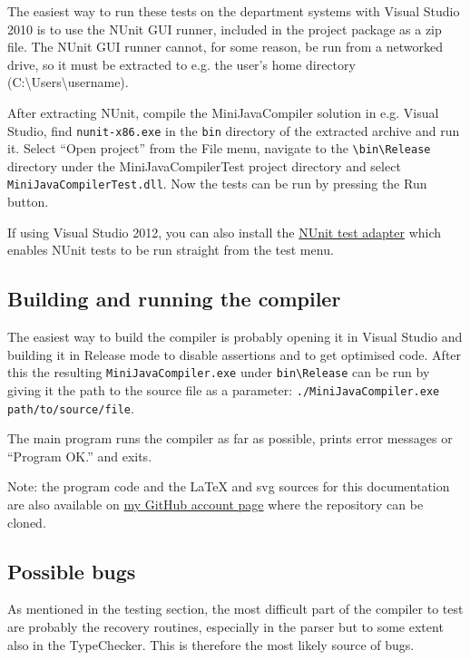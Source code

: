 \documentclass[a4paper,11pt]{article}
\begin{document}
The easiest way to run these tests on the department systems with Visual Studio 2010 is to use the NUnit GUI runner, included in the project package as a zip file. The NUnit GUI runner cannot, for some reason, be run from a networked drive, so it must be extracted to e.g. the user's home directory (C:\textbackslash Users\textbackslash username).

After extracting NUnit, compile the MiniJavaCompiler solution in e.g. Visual Studio, find \verb,nunit-x86.exe, in the \verb,bin, directory of the extracted archive and run it. Select ``Open project'' from the File menu, navigate to the \verb,\bin\Release, directory under the MiniJavaCompilerTest project directory and select \verb,MiniJavaCompilerTest.dll,. Now the tests can be run by pressing the Run button.

If using Visual Studio 2012, you can also install the \href{http://nunit.org/index.php?p=vsTestAdapter&r=2.6.1}{NUnit test adapter} which enables NUnit tests to be run straight from the test menu.

\subsection{Building and running the compiler}

The easiest way to build the compiler is probably opening it in Visual Studio and building it in Release mode to disable assertions and to get optimised code. After this the resulting \verb,MiniJavaCompiler.exe, under \verb,bin\Release, can be run by giving it the path to the source file as a parameter: \verb,./MiniJavaCompiler.exe path/to/source/file,.

The main program runs the compiler as far as possible, prints error messages or ``Program OK.'' and exits.

Note: the program code and the \LaTeX{} and svg sources for this documentation are also available on \href{https://github.com/Lateks/MiniJavaCompiler}{my GitHub account page} where the repository can be cloned.

\subsection{Possible bugs}

As mentioned in the testing section, the most difficult part of the compiler to test are probably the recovery routines, especially in the parser but to some extent also in the TypeChecker. This is therefore the most likely source of bugs.
\end{document}
